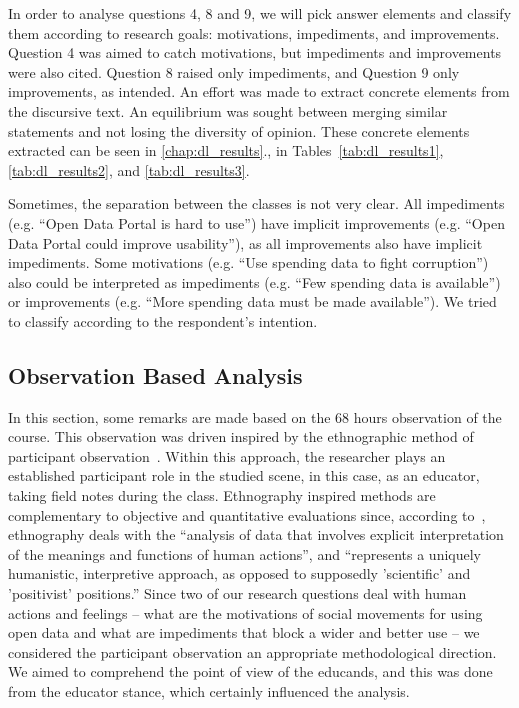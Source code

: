 In order to analyse questions 4, 8 and 9, we will pick answer elements and classify them according to research 
goals: motivations, impediments, and improvements. Question 4 was aimed to catch motivations, but impediments and improvements were also cited. Question 8 raised only impediments, and Question 9 only improvements, as intended.
An effort was made to extract concrete elements from the discursive text. An equilibrium was sought between merging similar statements and not losing the diversity of opinion. These concrete elements extracted can be seen in \autoref{chap:dl_results}., in Tables~\ref{tab:dl_results1}, \ref{tab:dl_results2}, and \ref{tab:dl_results3}.

Sometimes, the separation between the classes is not very clear. All impediments (e.g. “Open Data Portal is hard to use”) have implicit improvements (e.g. “Open Data Portal could improve usability”), as all improvements also have implicit impediments. Some motivations (e.g. “Use spending data to fight corruption”) also could be interpreted as impediments (e.g. “Few spending data is available”) or improvements (e.g. “More spending data must be made available”). We tried to classify according to the respondent's intention.

\subsection{Observation Based Analysis}

In this section, some remarks are made based on the 68 hours observation of the course. This observation was driven inspired by the ethnographic method of participant observation~\cite{Atkinson1994}. Within this approach, the researcher plays an established participant role in the studied scene, in this case, as an educator, taking field notes during the class. Ethnography inspired methods are complementary to objective and quantitative evaluations since, according to~, ethnography deals with the “analysis of data that involves explicit interpretation of the meanings and functions of human actions”, and “represents a uniquely humanistic, interpretive approach, as opposed to supposedly 'scientific' and 'positivist' positions.” Since two of our research questions deal with human actions and feelings – what are the motivations of social movements for using open data and what are impediments that block a wider and better use – we considered the participant observation an appropriate methodological direction. We aimed to comprehend the point of view of the educands, and this was done from the educator stance, which certainly influenced the analysis.

